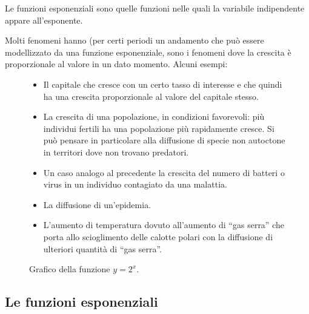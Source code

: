 \begin{definizione}{
Le funzioni esponenziali
sono quelle funzioni nelle quali la variabile indipendente appare all'esponente.
}
\end{definizione}

Molti fenomeni hanno (per certi periodi un andamento che può essere 
modellizzato da una funzione esponenziale, sono i fenomeni dove la crescita è 
proporzionale al valore in un dato momento. Alcuni esempi:

\begin{figure}[h]
 \centering
 \begin{minipage}[]{.48\textwidth}
\begin{itemize}
 \item 
Il capitale che cresce con un certo tasso di interesse e che quindi ha una 
crescita proporzionale al valore del capitale stesso.
 \item 
La crescita di una popolazione, in condizioni favorevoli: più individui fertili 
ha una popolazione più rapidamente cresce. 
Si può pensare in particolare alla diffusione di specie non autoctone in 
territori dove non trovano predatori.
 \item 
Un caso analogo al precedente la crescita del numero di batteri o virus in un 
individuo contagiato da una malattia.
 \item 
La diffusione di un'epidemia.
 \item 
L'aumento di temperatura dovuto all'aumento di ``gas serra'' che porta allo 
scioglimento delle calotte polari con la diffusione di ulteriori quantità di 
``gas serra''.
\end{itemize}

\end{minipage}
\begin{minipage}[]{.48\textwidth}
\begin{center}
\begin{inaccessibleblock}
  \graficoesponenziale
  \caption{Grafico della funzione \(y=2^x\).} \label{fig:funx2^x}
\end{inaccessibleblock}
\end{center}
\end{minipage}
\end{figure}

\subsection{Le funzioni esponenziali}
\label{subsec:esplog_fesponenziale}

